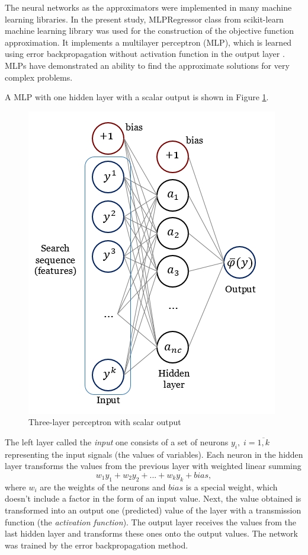 \documentclass[applsci,article,submit,moreauthors,pdftex]{Definitions/mdpi}
\begin{document}
The neural networks as the approximators were implemented in many machine learning libraries.
In the present study, MLPRegressor class from scikit-learn machine learning library was used for the construction of the objective function approximation. It implements a multilayer perceptron (MLP), which is learned using error backpropagation without activation function in the output layer \cite{Nielsen1989}. MLPs have demonstrated an ability to find the approximate solutions for very complex problems.

A MLP with one hidden layer with a scalar output is shown in Figure \ref{fig1}.

\begin{figure}[H]
\begin{center}
\includegraphics[width=0.5\linewidth]{perceptron.jpg}
\caption{Three-layer perceptron with scalar output}
\label{fig1}
\end{center}
\end{figure}   

The left layer called the \textit{input} one consists of a set of neurons $y_i, \; i=\overline{1,k}$ representing the input signals (the values of variables). Each neuron in the hidden layer transforms the values from the previous layer with weighted linear summing 
\[
w_1 y_1 + w_2 y_2+...+w_k y_k+bias,
\]
where $w_i$ are the weights of the neurons and $bias$ is a special weight, which doesn't include a factor in the form of an input value. Next, the value obtained is transformed into an output one (predicted) value of the layer with a transmission function (the \textit{activation function}). The output layer receives the values from the last hidden layer and transforms these ones onto the output values. The network was trained by the error backpropagation method.
\end{document}
